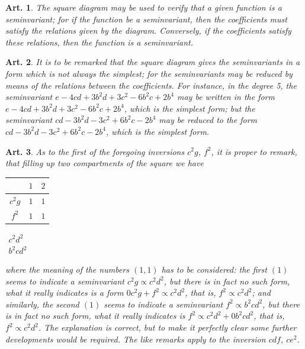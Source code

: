 \documentclass[11pt,a4paper]{article}
\theoremstyle{cayley}
\newtheorem{art}{Art.}[section]
\begin{document}
\setcounter{art}{45}
\begin{art}
The square diagram may be used to verify that a given function is a seminvariant; for if the function be a seminvariant, then the coefficients must satisfy the relations given by the diagram. Conversely, if the coefficients satisfy these relations, then the function is a seminvariant.
\end{art}

\setcounter{art}{46}
\begin{art}
It is to be remarked that the square diagram gives the seminvariants in a form which is not always the simplest; for the seminvariants may be reduced by means of the relations between the coefficients. For instance, in the degree 5, the seminvariant $e - 4cd + 3b^{2}d + 3c^{2} - 6b^{2}c + 2b^{4}$ may be written in the form $e - 4cd + 3b^{2}d + 3c^{2} - 6b^{2}c + 2b^{4}$, which is the simplest form; but the seminvariant $cd - 3b^{2}d - 3c^{2} + 6b^{2}c - 2b^{4}$ may be reduced to the form $cd - 3b^{2}d - 3c^{2} + 6b^{2}c - 2b^{4}$, which is the simplest form.
\end{art}

\setcounter{art}{47}
\begin{art}
As to the first of the foregoing inversions $c^{2}g$, $f^{2}$, it is proper to remark, that filling up two compartments of the square we have
\begin{center}
\begin{tabular}{c|cc}
 & $1$ & $2$ \\
\hline
$c^{2}g$ & $1$ & $1$ \\
$f^{2}$ & $1$ & $1$ \\
\end{tabular}
\quad
$\begin{array}{c}c^{2}d^{2}\\ b^{2}cd^{2}\end{array}$
\end{center}
where the meaning of the numbers $(1, 1)$ has to be considered: the first $(1)$ seems to indicate a seminvariant $c^{2}g \propto c^{2}d^{2}$, but there is in fact no such form, what it really indicates is a form $0c^{2}g + f^{2} \propto c^{2}d^{2}$, that is, $f^{2} \propto c^{2}d^{2}$; and similarly, the second $(1)$ seems to indicate a seminvariant $f^{2} \propto b^{2}cd^{2}$, but there is in fact no such form, what it really indicates is $f^{2} \propto c^{2}d^{2} + 0b^{2}cd^{2}$, that is, $f^{2} \propto c^{2}d^{2}$. The explanation is correct, but to make it perfectly clear some further developments would be required. The like remarks apply to the inversion $cdf$, $ce^{2}$.
\end{art}
\end{document}
